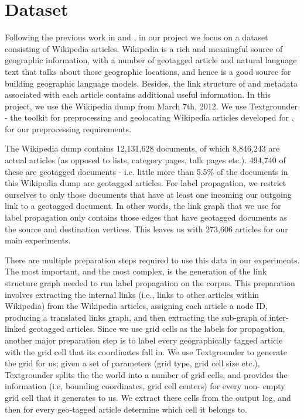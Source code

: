 
\section{Dataset}   
\par Following the previous work in  and 
, in our project we focus on a
dataset consisting of Wikipedia articles. Wikipedia is a rich and meaningful
source of geographic information, with a number of geotagged article and
natural language text that talks about those geographic locations, and hence
is a good source for building geographic language models. Besides, the link
structure of and metadata associated with each  article contains additional
useful information. In this project, we use the Wikipedia dump from March 7th,
2012. We use Textgrounder - the toolkit for preprocessing and geolocating
Wikipedia articles developed for , for our
preprocessing requirements.

\par The Wikipedia dump contains 12,131,628 documents, of which 8,846,243 are
actual articles  (as opposed to lists, category pages, talk pages etc.).
494,740 of these are geotagged documents - i.e. little more than 5.5\% of the
documents in this Wikipedia dump are geotagged articles.  For label
propagation, we restrict ourselves to only those documents that have at least
one incoming our outgoing link to a geotagged document. In other words, the
link graph that we use for label propagation only contains those edges that
have geotagged documents as the source and destination vertices. This leaves
us with 273,606 articles for our main experiments.

\par There are multiple preparation steps required to use this data in our
experiments. The most important, and the most complex, is the generation of
the  link structure graph needed to run label propagation on the corpus. This
preparation involves extracting the internal links (i.e., links to other
articles within Wikipedia)  from the Wikipedia articles, assigning each
article a node ID, producing a translated links  graph, and then extracting
the sub-graph of inter-linked geotagged articles. Since we use grid cells as
the labels for propagation,  another major preparation step is to label every
geographically tagged article  with the grid cell that its coordinates fall
in. We use Textgrounder to generate the grid for us;  given a set of
parameters (grid type, grid cell size etc.), Textgrounder splits the the world into
a number of grid cells, and provides the information (i.e, bounding
coordinates, grid cell centers) for every  non- empty grid cell that it
generates to us. We extract these cells from the output  log, and then for
every geo-tagged article determine which cell it belongs to.

